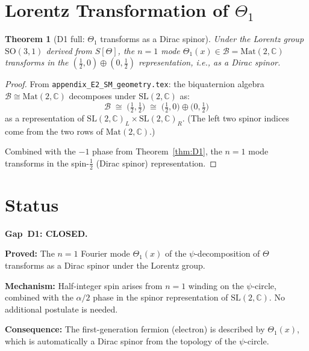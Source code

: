 \documentclass[12pt,a4paper]{article}
\newtheorem{theorem}{Theorem}[section]
\theoremstyle{definition}
\theoremstyle{remark}
\begin{document}
\section{Lorentz Transformation of $\Theta_1$}
\label{sec:lorentz}

\begin{theorem}[D1 full: $\Theta_1$ transforms as a Dirac spinor]
\label{thm:dirac}
Under the Lorentz group $\mathrm{SO}(3,1)$ derived from $S[\Theta]$,
the $n=1$ mode $\Theta_1(x) \in \mathcal{B} = \mathrm{Mat}(2,\mathbb{C})$
transforms in the $(\frac{1}{2}, 0) \oplus (0, \frac{1}{2})$
representation, i.e., as a Dirac spinor.
\end{theorem}

\begin{proof}
From \texttt{appendix\_E2\_SM\_geometry.tex}: the biquaternion algebra
$\mathcal{B} \cong \mathrm{Mat}(2,\mathbb{C})$ decomposes under
$\mathrm{SL}(2,\mathbb{C})$ as:
\begin{equation}
  \mathcal{B} \;\cong\; \bigl(\tfrac{1}{2},\tfrac{1}{2}\bigr)
  \;\cong\; \bigl(\tfrac{1}{2},0\bigr) \oplus \bigl(0,\tfrac{1}{2}\bigr)
\end{equation}
as a representation of $\mathrm{SL}(2,\mathbb{C})_L \times \mathrm{SL}(2,\mathbb{C})_R$.
(The left two spinor indices come from the two rows of $\mathrm{Mat}(2,\mathbb{C})$.)

Combined with the $-1$ phase from Theorem~\ref{thm:D1}, the $n=1$ mode
transforms in the spin-$\frac{1}{2}$ (Dirac spinor) representation.
\end{proof}

\section{Status}
\label{sec:status}

\begin{resultbox}
\textbf{Gap~D1: CLOSED.}

\textbf{Proved:} The $n=1$ Fourier mode $\Theta_1(x)$ of the
$\psi$-decomposition of $\Theta$ transforms as a Dirac spinor
under the Lorentz group.

\textbf{Mechanism:} Half-integer spin arises from $n=1$ winding on
the $\psi$-circle, combined with the $\alpha/2$ phase in the
spinor representation of $\mathrm{SL}(2,\mathbb{C})$.  No additional
postulate is needed.

\textbf{Consequence:} The first-generation fermion (electron) is
described by $\Theta_1(x)$, which is automatically a Dirac spinor
from the topology of the $\psi$-circle.
\end{resultbox}

\ifdefined\INCLUDEMODE
\else
  
\end{document}
